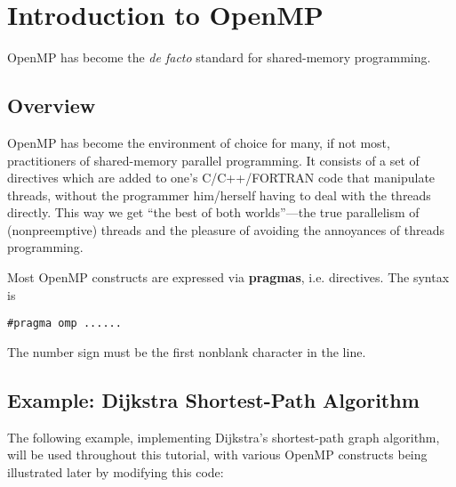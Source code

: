 \chapter{Introduction to OpenMP}
\label{chap:omp}

OpenMP has become the {\it de facto} standard for shared-memory
programming.

\section{Overview}

OpenMP has become the environment of choice for many, if not most,
practitioners of shared-memory parallel programming.  It consists of a
set of directives which are added to one's C/C++/FORTRAN code that
manipulate threads, without the programmer him/herself having to deal
with the threads directly.  This way we get ``the best of both
worlds''---the true parallelism of (nonpreemptive) threads and the
pleasure of avoiding the annoyances of threads programming.

Most OpenMP constructs are expressed via {\bf pragmas}, i.e. directives.
The syntax is

\begin{Verbatim}
#pragma omp ......
\end{Verbatim}

The number sign must be the first nonblank character in the line.

\section{Example:  Dijkstra Shortest-Path Algorithm}
\label{running}

The following example, implementing Dijkstra's shortest-path graph
algorithm, will be used throughout this tutorial, with various OpenMP
constructs being illustrated later by modifying this code:

